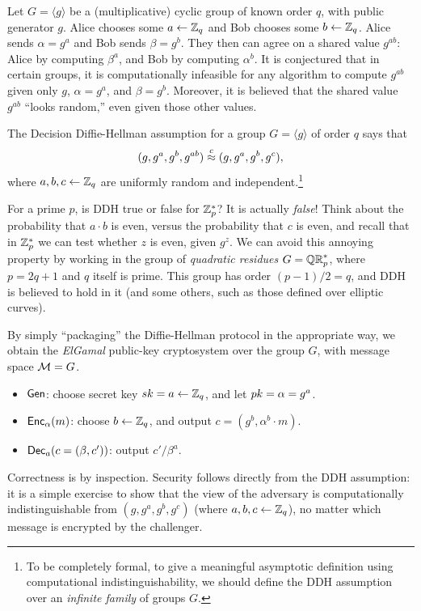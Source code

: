 \documentclass[11pt]{article}
\begin{document}
Let $G = \langle g \rangle$ be a (multiplicative) cyclic group of
known order $q$, with public generator $g$.  Alice chooses some $a
\gets \mathbb{Z}_q$ and Bob chooses some $b \gets \mathbb{Z}_q$.  Alice sends $\alpha =
g^{a}$ and Bob sends $\beta = g^{b}$.  They then can agree on a shared
value $g^{ab}$: Alice by computing $\beta^{a}$, and Bob by computing
$\alpha^{b}$.  It is conjectured that in certain groups, it is
computationally infeasible for any algorithm to compute $g^{ab}$ given
only $g$, $\alpha = g^{a}$, and $\beta = g^{b}$.  Moreover, it is
believed that the shared value $g^{ab}$ ``looks random,'' even given
those other values.

\begin{conjecture}
  The Decision Diffie-Hellman assumption for a group $G = \langle g
  \rangle$ of order $q$ says that
  \[ (g, g^{a}, g^{b}, g^{ab}) \stackrel{c}{\approx} (g, g^{a}, g^{b}, g^{c}), \]
  where $a, b, c \gets \mathbb{Z}_q$ are uniformly random and
  independent.\footnote{To be completely formal, to give a meaningful
    asymptotic definition using computational indistinguishability, we
    should define the DDH assumption over an \emph{infinite family} of
    groups $G$.}
\end{conjecture}

For a prime $p$, is DDH true or false for $\mathbb{Z}_p^{*}$?  It is actually
\emph{false}!  Think about the probability that $a \cdot b$ is even,
versus the probability that $c$ is even, and recall that in $\mathbb{Z}_p^{*}$
we can test whether $z$ is even, given $g^{z}$.  We can avoid this
annoying property by working in the group of \emph{quadratic residues}
$G = \mathbb{QR}_{p}^{*}$, where $p=2q+1$ and $q$ itself is prime.  This group
has order $(p-1)/2 = q$, and DDH is believed to hold in it (and some
others, such as those defined over elliptic curves).

By simply ``packaging'' the Diffie-Hellman protocol in the appropriate
way, we obtain the \emph{ElGamal} public-key cryptosystem over the
group $G$, with message space $\mathcal{M} = G$.
\begin{itemize}
\item $\mathsf{Gen}$: choose secret key $sk = a \gets \mathbb{Z}_q$, and let $pk =
  \alpha = g^{a}$.
\item $\mathsf{Enc}_{\alpha}(m)$: choose $b \gets \mathbb{Z}_q$, and output $c =
  (g^{b}, \alpha^{b} \cdot m)$.
\item $\mathsf{Dec}_{a}(c = (\beta, c'))$: output $c' / \beta^{a}$.
\end{itemize}
Correctness is by inspection.  Security follows directly from the DDH
assumption: it is a simple exercise to show that the view of the
adversary is computationally indistinguishable from $(g, g^{a}, g^{b},
g^{c})$ (where $a, b, c \gets \mathbb{Z}_q$), no matter which message is
encrypted by the challenger.
\end{document}
